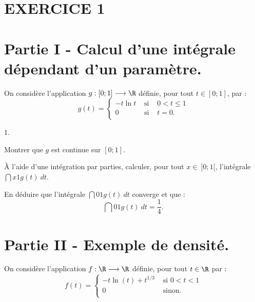 \documentclass[11pt]{article}%
\begin{document}


\vspace*{0.5cm}

\section*{EXERCICE 1}

\section*{Partie I - Calcul d'une intégrale dépendant d'un paramètre.}
\noindent On considère l'application $g : [ 0 ; 1] \longrightarrow \R$
définie, pour tout $t \in [ 0 ; 1]$, par : 
\[
g(t) = \left\{ 
\begin{array}{ccl}
 - t \ln t & \text{ si } & 0 < t \leq 1 \\
0 & \text{ si } & t = 0. \\
\end{array}
\right. 
\]
 

\begin{noliste}{1.}
 \setlength{\itemsep}{4mm}

\item Montrer que $g$ est continue sur $[ 0 ; 1]$. \\

\item \`{A} l'aide d'une intégration par parties, calculer, pour tout
$x \in \ ] 0 ; 1[ $, l'intégrale $\dint{x}{1} g(t)\ dt$. \\

\item En déduire que l'intégrale $\dint{0}{1} g(t)\ dt$ converge et que
: 
\[
 \dint{0}{1} g(t)\ dt = \frac{1}{4}.
\]

\end{noliste}

\section*{Partie II - Exemple de densité.}
\noindent On considère l'application $f : \R \longrightarrow \R$
définie, pour tout $t \in \R$ par :
\[
 f(t) = \left\{ 
\begin{array}{cl}
 - t \ln (t) + t^{ 1/3} & \text{ si } 0 < t < 1 \\
0 & \text{ sinon.} \\
\end{array}
\right. 
\]
\end{document}
